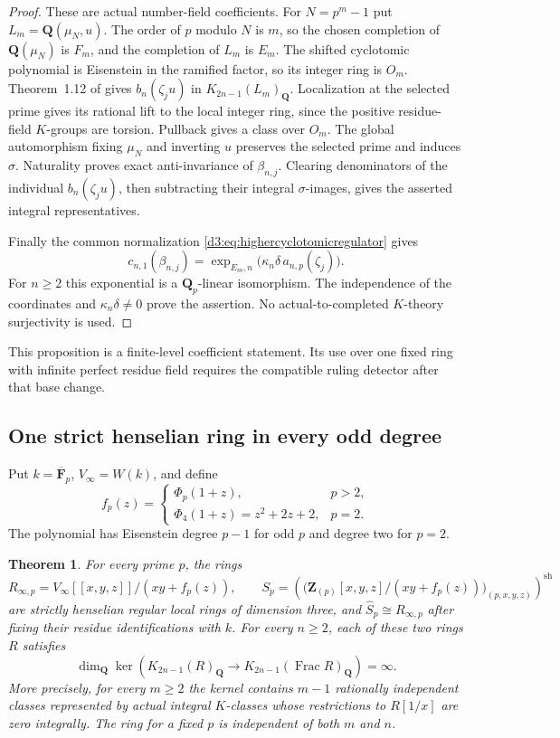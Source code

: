 \documentclass[11pt,a4paper]{amsart}
\numberwithin{equation}{section}
\newtheorem{theorem}{Theorem}[section]
\theoremstyle{definition}
\theoremstyle{remark}
\newcommand{\Q}{\mathbf Q}
\newcommand{\Z}{\mathbf Z}
\newcommand{\F}{\mathbf F}
\newcommand{\Frac}{\operatorname{Frac}}
\begin{document}
\begin{proof}
These are actual number-field coefficients. For $N=p^m-1$ put
$L_m=\Q(\mu_N,u)$.
The order of $p$ modulo $N$ is $m$, so the chosen completion
of $\Q(\mu_N)$ is $F_m$, and the completion of $L_m$ is $E_m$.
The shifted cyclotomic polynomial is Eisenstein in the ramified
factor, so its integer ring is $O_m$.
Theorem~1.12 of \cite{BesserDeJeu} gives $b_n(\zeta_ju)$ in
$K_{2n-1}(L_m)_{\Q}$.
Localization at the selected prime gives its rational lift to the
local integer ring, since the positive residue-field $K$-groups
are torsion. Pullback gives a class over $O_m$.
The global automorphism fixing $\mu_N$ and inverting $u$ preserves
the selected prime and induces $\sigma$.
Naturality proves exact anti-invariance of $\beta_{n,j}$.
Clearing denominators of the individual $b_n(\zeta_ju)$, then
subtracting their integral $\sigma$-images, gives the asserted
integral representatives.

Finally the common normalization
\eqref{d3:eq:highercyclotomicregulator} gives
\[
 c_{n,1}(\beta_{n,j})
 =\exp_{E_m,n}\bigl(\kappa_n\delta\,a_{n,p}(\zeta_j)\bigr).
\]
For $n\geq2$ this exponential is a $\Q_p$-linear isomorphism.
The independence of the coordinates and $\kappa_n\delta\ne0$
prove the assertion. No actual-to-completed $K$-theory
surjectivity is used.
\end{proof}

This proposition is a finite-level coefficient statement.
Its use over one fixed ring with infinite perfect residue field
requires the compatible ruling detector after that base change.


\subsection{One strict henselian ring in every odd degree}
\label{d3:sec:strictallprimeallodd}

Put $k=\overline{\F}_p$, $V_\infty=W(k)$, and define
\[
 f_p(z)=
 \begin{cases}
  \Phi_p(1+z),&p>2,\\
  \Phi_4(1+z)=z^2+2z+2,&p=2.
 \end{cases}
\]
The polynomial has Eisenstein degree $p-1$ for odd $p$ and degree
two for $p=2$.

\begin{theorem}\label{d3:thm:strictallprimeallodd}
For every prime $p$, the rings
\[
 R_{\infty,p}=V_\infty[[x,y,z]]/(xy+f_p(z)),\qquad
 S_p=\left(
  \bigl(\Z_{(p)}[x,y,z]/(xy+f_p(z))\bigr)_{(p,x,y,z)}
       \right)^{\mathrm{sh}}
\]
are strictly henselian regular local rings of dimension three,
and $\widehat S_p\cong R_{\infty,p}$ after fixing their residue
identifications with $k$.
For every $n\geq2$, each of these two rings $R$ satisfies
\[
 \dim_{\Q}\ker\left(
 K_{2n-1}(R)_{\Q}\longrightarrow
 K_{2n-1}(\Frac R)_{\Q}\right)=\infty.
\]
More precisely, for every $m\geq2$ the kernel contains $m-1$
rationally independent classes represented by actual integral
$K$-classes whose restrictions to $R[1/x]$ are zero integrally.
The ring for a fixed $p$ is independent of both $m$ and $n$.
\end{theorem}
\end{document}
